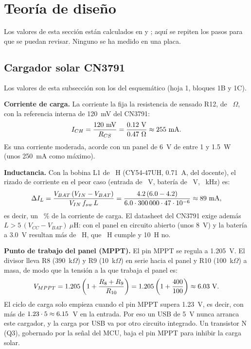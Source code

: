 \section{Teoría de diseño}

Los valores de esta sección están calculados en  y
; aquí se repiten los pasos para que se puedan revisar. Ninguno se
ha medido en una placa.

\subsection{Cargador solar CN3791}

Los valores de esta subsección son los del esquemático (hoja 1, bloques 1B y 1C).

\textbf{Corriente de carga.} La corriente la fija la resistencia de sensado R12, de \cRcs~$\Omega$, con la
referencia interna de 120~mV del CN3791:
\[
I_{CH} = \frac{120~\text{mV}}{R_{CS}} = \frac{0.12~\text{V}}{0.47~\Omega} \approx 255~\text{mA}.
\]
Es una corriente moderada, acorde con un panel de 6~V de entre 1 y 1.5~W (unos 250~mA como máximo).

\textbf{Inductancia.} Con la bobina L1 de \cLused~\textmu H (CY54-47UH, 0.71~A, del docente), el rizado de
corriente en el peor caso (entrada de \cVin~V, batería de \cVbat~V, \cFsw~kHz) es:
\[
\Delta I_L = \frac{V_{BAT}\,(V_{IN}-V_{BAT})}{V_{IN}\,f_{sw}\,L}
  = \frac{4.2\,(6.0-4.2)}{6.0\cdot 300\,000\cdot 47\cdot 10^{-6}} \approx 89~\text{mA},
\]
es decir, un \cRipplePct~\% de la corriente de carga. El datasheet del CN3791 exige además
$L > 5\,(V_{CC}-V_{BAT})~\mu\text{H}$: con el panel en circuito abierto (unos 8~V) y la batería a 3.0~V
resultan más de \cLmin~\textmu H, que \cLused~\textmu H cumple y 10~\textmu H no.

\textbf{Punto de trabajo del panel (MPPT).} El pin MPPT se regula a 1.205~V. El divisor lleva
R8 (390~k$\Omega$) y R9 (10~k$\Omega$) en serie hacia el panel y R10 (100~k$\Omega$) a masa, de modo que
la tensión a la que trabaja el panel es:
\[
V_{MPPT} = 1.205\left(1+\frac{R_8+R_9}{R_{10}}\right) = 1.205\left(1+\frac{400}{100}\right) \approx 6.03~\text{V}.
\]
El ciclo de carga solo empieza cuando el pin MPPT supera 1.23~V, es decir, con más de
$1.23\cdot 5 \approx 6.15$~V en la entrada. Por eso un USB de 5~V nunca arranca este cargador, y la
carga por USB va por otro circuito integrado. Un transistor N (Q3), gobernado por la señal
 del MCU, baja el pin MPPT para inhibir la carga solar.

